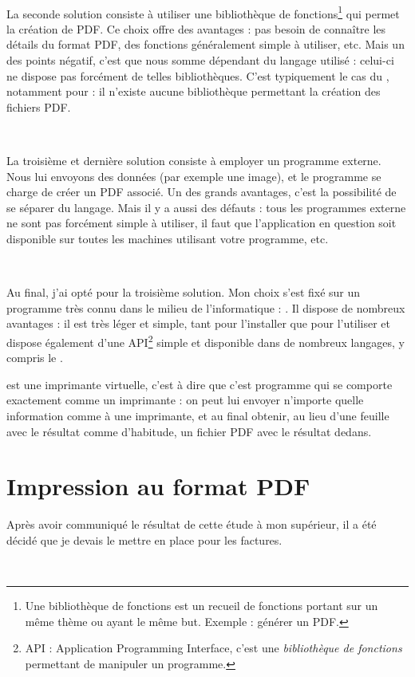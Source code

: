 ~

La seconde solution consiste à utiliser une bibliothèque de fonctions\footnote{Une bibliothèque de fonctions est un recueil de fonctions portant sur un même thème ou ayant le même but. Exemple : générer un PDF.} qui permet la création de PDF. Ce choix offre des avantages : pas besoin de connaître les détails du format PDF, des fonctions généralement simple à utiliser, etc. Mais un des points négatif, c'est que nous somme dépendant du langage utilisé : celui-ci ne dispose pas forcément de telles bibliothèques. C'est typiquement le cas du \vb, notamment pour  : il n'existe aucune bibliothèque permettant la création des fichiers PDF.

~

La troisième et dernière solution consiste à employer un programme externe. Nous lui envoyons des données (par exemple une image), et le programme se charge de créer un PDF associé. Un des grands avantages, c'est la possibilité de se séparer du langage. Mais il y a aussi des défauts : tous les programmes externe ne sont pas forcément simple à utiliser, il faut que l'application en question soit disponible sur toutes les machines utilisant votre programme, etc.

~

Au final, j'ai opté pour la troisième solution. Mon choix s'est fixé sur un programme très connu dans le milieu de l'informatique : \pdfcreator. Il dispose de nombreux avantages : il est très léger et simple, tant pour l'installer que pour l'utiliser et dispose également d'une API\footnote{API : Application Programming Interface, c'est une \emph{bibliothèque de fonctions} permettant de manipuler un programme.} simple et disponible dans de nombreux langages, y compris le \vb.

\pdfcreator{} est une imprimante virtuelle, c'est à dire que c'est programme qui se comporte exactement comme un imprimante : on peut lui envoyer n'importe quelle information comme à une imprimante, et au final obtenir, au lieu d'une feuille avec le résultat comme d'habitude, un fichier PDF avec le résultat dedans.

\section{Impression au format PDF}
Après avoir communiqué le résultat de cette étude à mon supérieur, il a été décidé que je devais le mettre en place pour les factures.

~

